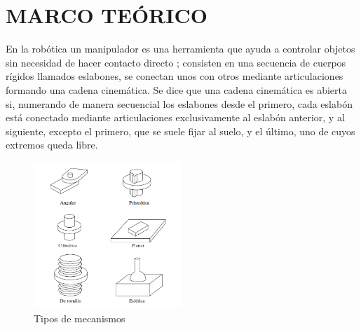 \renewcommand\thechapter{\Roman{chapter}}
\chapter{MARCO TEÓRICO} \label{ch:marco} \thispagestyle{fancy}
\renewcommand\thechapter{\arabic{chapter}}
En la robótica un manipulador es una herramienta que ayuda a controlar objetos sin necesidad de hacer contacto directo \cite{ARQHYS-2012}; consisten en una secuencia de cuerpos rígidos llamados eslabones, se conectan unos con otros mediante articulaciones formando una cadena cinemática. Se dice que una cadena cinemática es abierta si, numerando de manera secuencial los eslabones desde el primero, cada eslabón está conectado mediante articulaciones exclusivamente al eslabón anterior, y al siguiente, excepto el primero, que se suele fijar al suelo, y el último, uno de cuyos extremos queda libre.

\begin{figure}
\centering
\includegraphics[width=0.5\textwidth, height=0.375\textheight]{./figs/6Articulaciones}
\caption{Tipos de mecanismos}
\label{mecanismos}
\end{figure}

